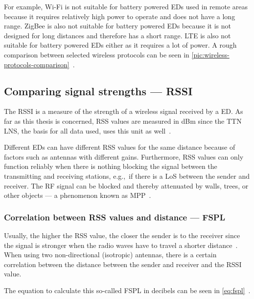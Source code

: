 For example, Wi-Fi is not suitable for battery powered \aclp{ED} used in remote areas because it requires relatively high power to operate and does not have a long range.
ZigBee is also not suitable for battery powered \aclp{ED} because it is not designed for long distances and therefore has a short range.
\ac{LTE} is also not suitable for battery powered \aclp{ED} either as it requires a lot of power.
A rough comparison between selected wireless protocols can be seen in \cref{pic:wireless-protocols-comparison}~\cite{wang_comparison_2021}.

\subsection{Comparing signal strengths — \acl{RSSI}}\label{sec:rssi}

The \acf{RSSI} is a measure of the strength of a wireless signal received by a \acl{ED}.
As far as this thesis is concerned, \ac{RSS} values are measured in dBm since the \ac{TTN} \ac{LNS}, the basis for all data used, uses this unit as well~\cite{the_things_industries_bv_data_2023}.

Different \aclp{ED} can have different \ac{RSS} values for the same distance because of factors such as antennas with different gains.
Furthermore, \ac{RSS} values can only function reliably when there is nothing blocking the signal between the transmitting and receiving stations, e.g.,\ if there is a \acl{LoS} between the sender and receiver.
The \ac{RF} signal can be blocked and thereby attenuated by walls, trees, or other objects --- a phenomenon known as \acf{MPP}~\cite{kucherov_investigation_2021}.

\subsubsection{Correlation between \acs{RSS} values and distance — \acf{FSPL}}\label{sec:background-free-space-path-loss}

Usually, the higher the \ac{RSS} value, the closer the sender is to the receiver since the signal is stronger when the radio waves have to travel a shorter distance~\cite{stutzman_antenna_1981}.
When using two non-directional (isotropic) antennas, there is a certain correlation between the distance between the sender and receiver and the \ac{RSSI} value.

The equation to calculate this so-called \acl{FSPL} in decibels can be seen in \cref{eq:fspl}~\cite[p. 1321]{whitaker_electronics_1996}.

